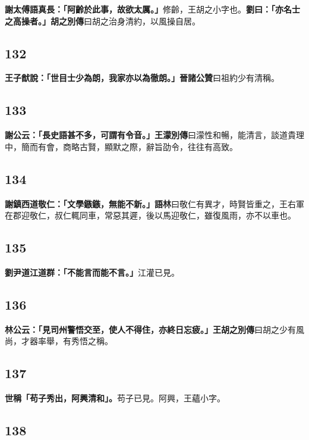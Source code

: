 \textbf{謝太傅語真長：「阿齡於此事，故欲太厲。」}{\footnotesize 修齡，王胡之小字也。}\textbf{劉曰：「亦名士之高操者。」}{\footnotesize \textbf{胡之別傳}曰胡之治身清約，以風操自居。}

\subsection*{132}

\textbf{王子猷說：「世目士少為朗，我家亦以為徹朗。」}{\footnotesize \textbf{晉諸公贊}曰祖約少有清稱。}

\subsection*{133}

\textbf{謝公云：「長史語甚不多，可謂有令音。」}{\footnotesize \textbf{王濛別傳}曰濛性和暢，能清言，談道貴理中，簡而有會，商略古賢，顯默之際，辭旨劭令，往往有高致。}

\subsection*{134}

\textbf{謝鎮西道敬仁：「文學鏃鏃，無能不新。」}{\footnotesize \textbf{語林}曰敬仁有異才，時賢皆重之，王右軍在郡迎敬仁，叔仁輒同車，常惡其遲，後以馬迎敬仁，雖復風雨，亦不以車也。}

\subsection*{135}

\textbf{劉尹道江道群：「不能言而能不言。」}{\footnotesize 江灌已見。}

\subsection*{136}

\textbf{林公云：「見司州警悟交至，使人不得住，亦終日忘疲。」}{\footnotesize \textbf{王胡之別傳}曰胡之少有風尚，才器率舉，有秀悟之稱。}

\subsection*{137}

\textbf{世稱「苟子秀出，阿興清和」。}{\footnotesize 苟子已見。阿興，王蘊小字。}

\subsection*{138}


